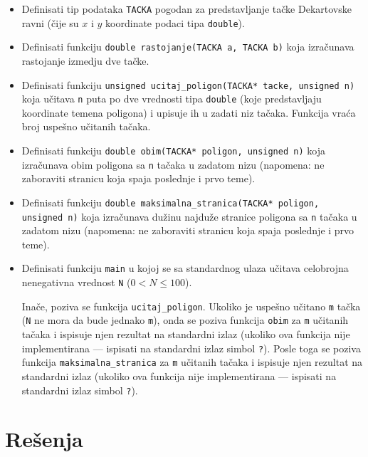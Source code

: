 \begin{Exercise}[label=p2.5_] 
\begin{itemize}
\item Definisati tip podataka \verb|TACKA| pogodan za predstavljanje ta\v cke
Dekartovske ravni (\v{c}ije su $x$ i $y$ koordinate podaci tipa \verb|double|).

\item Definisati funkciju \verb|double rastojanje(TACKA a, TACKA b)| koja
izra\v cunava rastojanje izmedju dve ta\v{c}ke.

\item Definisati funkciju \verb|unsigned ucitaj_poligon(TACKA* tacke, unsigned n)|
koja u\v citava \verb|n| puta po dve vrednosti tipa \verb|double|
 (koje predstavljaju koordinate temena poligona) i upisuje ih u zadati niz
 ta\v{c}aka. Funkcija vra\' ca broj uspe\v sno u\v citanih ta\v{c}aka.

\item Definisati funkciju \verb|double obim(TACKA* poligon, unsigned n)|
koja izra\v cunava obim poligona sa \verb|n| ta\v{c}aka u zadatom nizu
(napomena: ne zaboraviti stranicu koja spaja poslednje i prvo teme).

\item Definisati funkciju \verb|double maksimalna_stranica(TACKA* poligon, unsigned n)|
koja izra\v cunava du\v{z}inu najdu\v{z}e stranice poligona sa \verb|n| ta\v{c}aka
u zadatom nizu (napomena: ne zaboraviti stranicu koja spaja poslednje i prvo teme).

\item Definisati funkciju \verb|main| u kojoj se sa standardnog ulaza
u\v{c}itava celobrojna nenegativna vrednost \verb|N| ($0 < N \le 100$).

Ina\v{c}e, poziva se funkcija \verb|ucitaj_poligon|. Ukoliko je
uspe\v{s}no u\v{c}itano \verb|m| ta\v{c}ka (\verb|N| ne mora da
bude jednako \verb|m|), onda se poziva funkcija \verb|obim|
za \verb|m| u\v{c}itanih ta\v{c}aka i ispisuje njen rezultat
na standardni izlaz (ukoliko ova funkcija nije implementirana
--- ispisati na standardni izlaz simbol \verb|?|).
Posle toga se poziva funkcija \verb|maksimalna_stranica|
za \verb|m| u\v{c}itanih ta\v{c}aka i ispisuje njen rezultat
na standardni izlaz (ukoliko ova funkcija nije implementirana
--- ispisati na standardni izlaz simbol \verb|?|).
\end{itemize}
\end{Exercise}
\begin{Answer}[ref=p2.5_]
\end{Answer}


\section{Rešenja}
\shipoutAnswer


